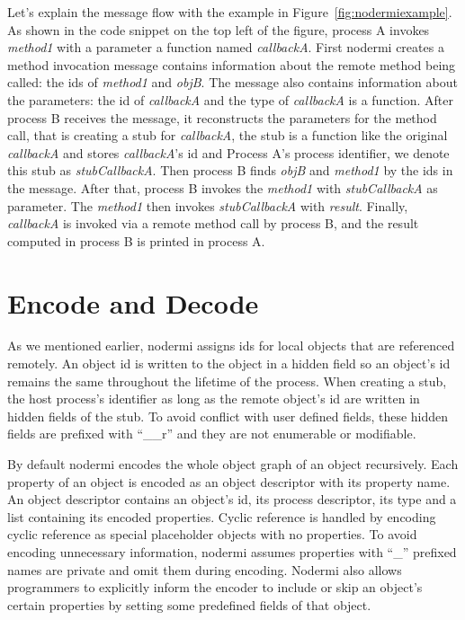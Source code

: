 Let's explain the message flow with the example 
in Figure~\ref{fig:nodermiexample}.
As shown in the code snippet on the top left of the figure,
process A invokes \emph{method1} with a parameter a function named \emph{callbackA}.
First nodermi creates a method invocation message
contains information about the remote method being called:
the ids of \emph{method1} and \emph{objB}.
The message also contains information about the parameters:
the id of \emph{callbackA} and the type of \emph{callbackA} is a function.
After process B receives the message,
it reconstructs the parameters for the method call,
that is creating a stub for \emph{callbackA},
the stub is a function like the original \emph{callbackA} and 
stores \emph{callbackA}'s id and Process A's process identifier,
we denote this stub as \emph{stubCallbackA}.
Then process B finds \emph{objB} and \emph{method1} by the ids in the message.
After that,
process B invokes the \emph{method1} with \emph{stubCallbackA} as parameter.
The \emph{method1} then invokes \emph{stubCallbackA} with \emph{result}.
Finally, \emph{callbackA} is invoked
via a remote method call by process B,
and the result computed in process B is printed in process A.


\section{Encode and Decode}
As we mentioned earlier, nodermi assigns ids for local
objects that are referenced remotely.
An object id is written to the object in a hidden field
so an object's id remains the same throughout the lifetime of the process.
When creating a stub,
the host process's identifier as long as the remote object's id
are written in hidden fields of the stub.
To avoid conflict with user defined fields, these hidden fields are prefixed
with ``\_\_r'' and they are not enumerable or modifiable.

By default nodermi encodes the whole object graph of an object recursively.
Each property of an object is encoded 
as an object descriptor with its property name.
An object descriptor contains an object's id, its process descriptor,
its type and a list containing its encoded properties.
Cyclic reference is handled by encoding cyclic reference as
special placeholder objects with no properties.
To avoid encoding unnecessary information,
nodermi assumes properties with ``\_'' prefixed names are private
 and omit them during encoding.
Nodermi also allows programmers to explicitly 
inform the encoder to include or skip 
an object's certain properties
by setting some predefined fields of that object.

